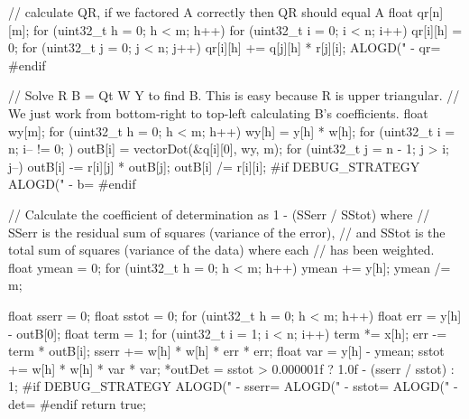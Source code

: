 {    // calculate QR, if we factored A correctly then QR should equal A
    float qr[n][m];
    for (uint32_t h = 0; h < m; h++) {
        for (uint32_t i = 0; i < n; i++) {
            qr[i][h] = 0;
            for (uint32_t j = 0; j < n; j++) {
                qr[i][h] += q[j][h] * r[j][i];
            }
        }
    }
    ALOGD("  - qr=%
#endif
    
    // Solve R B = Qt W Y to find B.  This is easy because R is upper triangular.
    // We just work from bottom-right to top-left calculating B's coefficients.
    float wy[m];
    for (uint32_t h = 0; h < m; h++) {
        wy[h] = y[h] * w[h];
    }
    for (uint32_t i = n; i-- != 0; ) {
        outB[i] = vectorDot(&q[i][0], wy, m);
        for (uint32_t j = n - 1; j > i; j--) {
            outB[i] -= r[i][j] * outB[j];
        }
        outB[i] /= r[i][i];
    }
#if DEBUG_STRATEGY
    ALOGD("  - b=%
#endif
    
    // Calculate the coefficient of determination as 1 - (SSerr / SStot) where
    // SSerr is the residual sum of squares (variance of the error),
    // and SStot is the total sum of squares (variance of the data) where each
    // has been weighted.
    float ymean = 0;
    for (uint32_t h = 0; h < m; h++) {
        ymean += y[h];
    }
    ymean /= m;
    
    float sserr = 0;
    float sstot = 0;
    for (uint32_t h = 0; h < m; h++) {
        float err = y[h] - outB[0];
        float term = 1;
        for (uint32_t i = 1; i < n; i++) {
            term *= x[h];
            err -= term * outB[i];
        }
        sserr += w[h] * w[h] * err * err;
        float var = y[h] - ymean;
        sstot += w[h] * w[h] * var * var;
    }
    *outDet = sstot > 0.000001f ? 1.0f - (sserr / sstot) : 1;
#if DEBUG_STRATEGY
    ALOGD("  - sserr=%
    ALOGD("  - sstot=%
    ALOGD("  - det=%
#endif
    return true;
}


